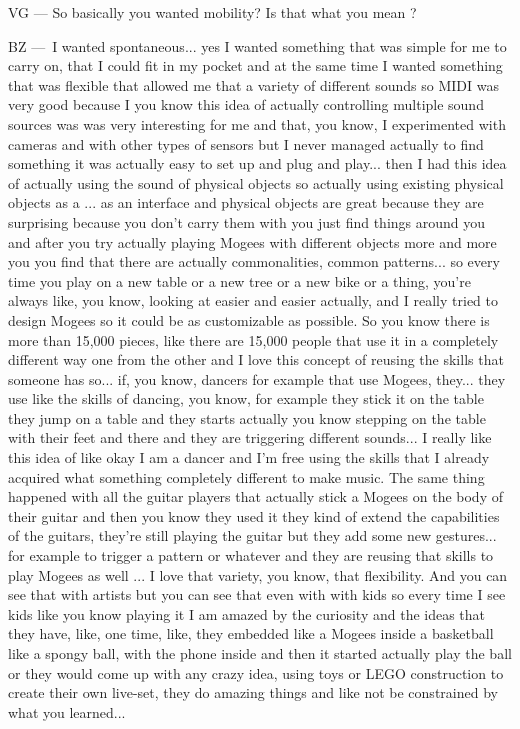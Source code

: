 VG — So basically you wanted mobility? Is that what you mean ?

BZ — I wanted spontaneous... yes I wanted something that was simple for me to carry on, that I could fit in my pocket and at the same time I wanted something that was flexible that allowed me that a variety of different sounds so MIDI was very good because I you know this idea of actually controlling multiple sound sources was was very interesting for me and that, you know, I experimented with cameras and with other types of sensors but I never managed actually to find something it was actually easy to set up and plug and play... then I had this idea of actually using the sound of physical objects so actually using existing physical objects as a ... as an interface and physical objects are great because they are surprising because you don't carry them with you just find things around you and after you try actually playing Mogees with different objects more and more you you find that there are actually commonalities, common patterns... so every time you play on a new table or a new tree or a new bike or a thing, you're always like, you know, looking at easier and easier actually, and I really tried to design Mogees so it could be as customizable as possible. So you know there is more than 15,000 pieces, like there are 15,000 people that use it in a completely different way one from the other and I love this concept of reusing the skills that someone has so... if, you know, dancers for example that use Mogees, they... they use like the skills of dancing, you know, for example they stick it on the table they jump on a table and they starts actually you know stepping on the table with their feet and there and they are triggering different sounds... I really like this idea of like okay I am a dancer and I'm free using the skills that I already acquired what something completely different to make music. The same thing happened with all the guitar players that actually stick a Mogees on the body of their guitar and then you know they used it they kind of extend the capabilities of the guitars, they're still playing the guitar but they add some new gestures... for example to trigger a pattern or whatever and they are reusing that skills to play Mogees as well ... I love that variety, you know, that flexibility. And you can see that with artists but you can see that even with with kids so every time I see kids like you know playing it I am amazed by the curiosity and the ideas that they have, like, one time, like, they embedded like a Mogees inside a basketball like a spongy ball, with the phone inside and then it started actually play the ball or they would come up with any crazy idea, using toys or LEGO construction to create their own live-set, they do amazing things and like not be constrained by what you learned...

